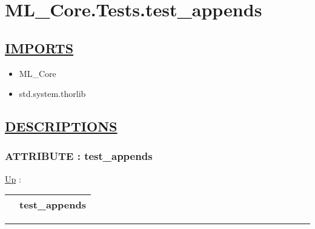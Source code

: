 \chapter*{ML\_Core.Tests.test\_appends}
\hypertarget{ecldoc:toc:ML_Core.Tests.test_appends}{}

\section*{\underline{IMPORTS}}
\begin{itemize}
\item ML\_Core
\item std.system.thorlib
\end{itemize}

\section*{\underline{DESCRIPTIONS}}
\subsection*{ATTRIBUTE : test\_appends}
\hypertarget{ecldoc:ml_core.tests.test_appends}{}
\hyperlink{ecldoc:toc:ML_Core/Tests}{Up} :

{\renewcommand{\arraystretch}{1.5}
\begin{tabularx}{\textwidth}{|>{\raggedright\arraybackslash}l|X|}
\hline
\hspace{0pt} & test\_appends \\
\hline
\end{tabularx}
}

\par


\rule{\linewidth}{0.5pt}

